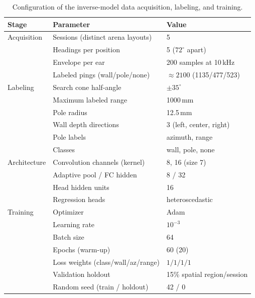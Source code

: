 \documentclass[11pt]{article}
\begin{document}
\begin{table}[htb]
\centering
\caption{Configuration of the inverse-model data acquisition, labeling, and training.}
\label{tab:inverse-params}
\begin{tabular}{lll}
\hline
\textbf{Stage} & \textbf{Parameter} & \textbf{Value} \\
\hline
Acquisition  & Sessions (distinct arena layouts) & 5 \\
             & Headings per position             & 5 ($72^{\circ}$ apart) \\
             & Envelope per ear                  & 200 samples at 10\,kHz \\
             & Labeled pings (wall/pole/none)    & ${\approx}2100$ (1135/477/523) \\
Labeling     & Search cone half-angle            & $\pm 35^{\circ}$ \\
             & Maximum labeled range             & 1000\,mm \\
             & Pole radius                       & 12.5\,mm \\
             & Wall depth directions             & 3 (left, center, right) \\
             & Pole labels                       & azimuth, range \\
             & Classes                           & wall, pole, none \\
Architecture & Convolution channels (kernel)     & 8, 16 (size 7) \\
             & Adaptive pool / FC hidden         & 8 / 32 \\
             & Head hidden units                 & 16 \\
             & Regression heads                  & heteroscedastic \\
Training     & Optimizer                         & Adam \\
             & Learning rate                     & $10^{-3}$ \\
             & Batch size                        & 64 \\
             & Epochs (warm-up)                  & 60 (20) \\
             & Loss weights (class/wall/az/range) & $1 / 1 / 1 / 1$ \\
             & Validation holdout                & 15\% spatial region/session \\
             & Random seed (train / holdout)     & 42 / 0 \\
\hline
\end{tabular}
\end{table}
\end{document}
